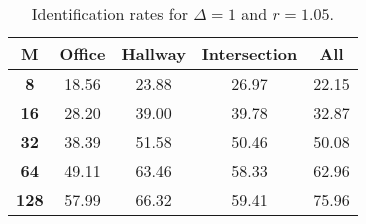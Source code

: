 \begin{table}[h]
    \footnotesize
    \centering
    \begin{tabular}{|c|c|c|c|l|}    
    \hline
    {\bf M} & {\bf Office} & {\bf Hallway} & {\bf Intersection} &     \multicolumn{1}{c|}{{\bf All}} \\ \hline
    {\bf 8} & 18.56 & 23.88 & 26.97 & 22.15 \\ \hline
    {\bf 16} & 28.20 & 39.00 & 39.78 & 32.87 \\ \hline
    {\bf 32} & 38.39 & 51.58 & 50.46 & 50.08 \\ \hline
    {\bf 64} & 49.11 & 63.46 & 58.33 & 62.96 \\ \hline
    {\bf 128} & 57.99 & 66.32 & 59.41 & 75.96 \\ \hline
    \end{tabular}
    \caption{Identification rates for $\Delta = 1$ and $r = 1.05$.}    
    \label{tab:identify_speakers_1.05_mit_19_1}
\end{table}
